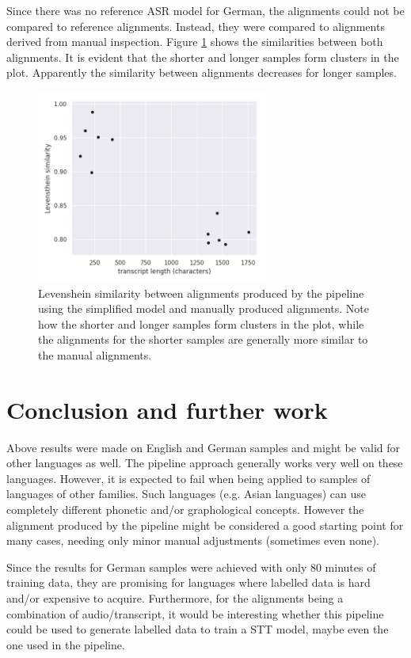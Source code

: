 \documentclass[letterpaper]{article}
\begin{document}
Since there was no reference ASR model for German, the alignments could not be compared to reference alignments. Instead, they were compared to alignments derived from manual inspection. Figure \ref{scatterplot_de} shows the similarities between both alignments. It is evident that the shorter and longer samples form clusters in the plot. Apparently the similarity between alignments decreases for longer samples.

\begin{figure}[!htb]
	\begin{center}
		\includegraphics[width=3in]{scatterplot_de.png}
		\caption{Levenshein similarity between alignments produced by the pipeline using the simplified model and manually produced alignments. Note how the shorter and longer samples form clusters in the plot, while the alignments for the shorter samples are generally more similar to the manual alignments.}
		\label{scatterplot_de}
	\end{center}
\end{figure}

\section{Conclusion and further work}

Above results were made on English and German samples and might be valid for other languages as well. The pipeline approach generally works very well on these languages. However, it is expected to fail when being applied to samples of languages of other families. Such languages (e.g. Asian languages) can use completely different phonetic and/or graphological concepts. However the alignment produced by the pipeline might be considered a good starting point for many cases, needing only minor manual adjustments (sometimes even none).

Since the results for German samples were achieved with only 80 minutes of training data, they are promising for languages where labelled data is hard and/or expensive to acquire. Furthermore, for the alignments being a combination of audio/transcript, it would be interesting whether this pipeline could be used to generate labelled data to train a STT model, maybe even the one used in the pipeline.


\footnotesize
\printbibliography
%
%
\end{document}
